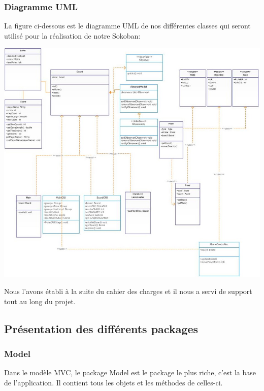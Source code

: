 \documentclass[a4paper,12pt]{article} %
\begin{document}
	\subsubsection{Diagramme UML}
	La figure ci-dessous est le diagramme UML de nos différentes classes qui seront utilisé pour la réalisation de notre Sokoban:\\
	\begin{center}
	\includegraphics[scale=0.56]{uml.png}
	\end{center}
	Nous l'avons établi à la suite du cahier des charges et il nous a servi de support tout au long du projet.
	
	\paragraph{}
	
	\subsection{Présentation des différents packages}
	
		\subsubsection{Model}
		Dans le modèle MVC, le package Model est le package le plus riche, c'est la base de l'application. Il contient tous les objets et les méthodes de celles-ci.
		
\end{document}
